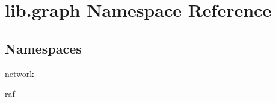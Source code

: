 \hypertarget{a00105}{\section{lib.\-graph Namespace Reference}
\label{a00105}
}
\subsection*{Namespaces}
\begin{DoxyCompactItemize}
\item 
\hyperlink{a00106}{network}
\item 
\hyperlink{a00107}{raf}
\end{DoxyCompactItemize}
